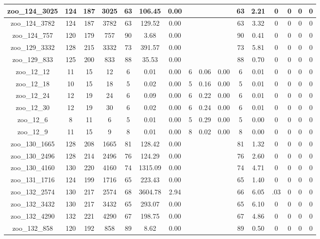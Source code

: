 \begin{landscape}
\begin{longtable}{|c|c|c|c|c|c|c|c|c|c|c|c|c|c|c|c|}
zoo\_124\_3025 & 124 & 187 & 3025 & 63 & 106.45 & 0.00 &  &  &  & 63 & 2.21 & 0 & 0 & 0 & 0 \\ \hline 
zoo\_124\_3782 & 124 & 187 & 3782 & 63 & 129.52 & 0.00 &  &  &  & 63 & 3.32 & 0 & 0 & 0 & 0 \\ \hline 
zoo\_124\_757 & 120 & 179 & 757 & 90 & 3.68 & 0.00 &  &  &  & 90 & 0.41 & 0 & 0 & 0 & 0 \\ \hline 
zoo\_129\_3332 & 128 & 215 & 3332 & 73 & 391.57 & 0.00 &  &  &  & 73 & 5.81 & 0 & 0 & 0 & 0 \\ \hline 
zoo\_129\_833 & 125 & 200 & 833 & 88 & 35.53 & 0.00 &  &  &  & 88 & 0.70 & 0 & 0 & 0 & 0 \\ \hline 
zoo\_12\_12 & 11 & 15 & 12 & 6 & 0.01 & 0.00 & 6 & 0.06 & 0.00 & 6 & 0.01 & 0 & 0 & 0 & 0 \\ \hline 
zoo\_12\_18 & 10 & 15 & 18 & 5 & 0.02 & 0.00 & 5 & 0.16 & 0.00 & 5 & 0.01 & 0 & 0 & 0 & 0 \\ \hline 
zoo\_12\_24 & 12 & 19 & 24 & 6 & 0.09 & 0.00 & 6 & 0.22 & 0.00 & 6 & 0.01 & 0 & 0 & 0 & 0 \\ \hline 
zoo\_12\_30 & 12 & 19 & 30 & 6 & 0.02 & 0.00 & 6 & 0.24 & 0.00 & 6 & 0.01 & 0 & 0 & 0 & 0 \\ \hline 
zoo\_12\_6 & 8 & 11 & 6 & 5 & 0.01 & 0.00 & 5 & 0.29 & 0.00 & 5 & 0.00 & 0 & 0 & 0 & 0 \\ \hline 
zoo\_12\_9 & 11 & 15 & 9 & 8 & 0.01 & 0.00 & 8 & 0.02 & 0.00 & 8 & 0.00 & 0 & 0 & 0 & 0 \\ \hline 
zoo\_130\_1665 & 128 & 208 & 1665 & 81 & 128.42 & 0.00 &  &  &  & 81 & 1.32 & 0 & 0 & 0 & 0 \\ \hline 
zoo\_130\_2496 & 128 & 214 & 2496 & 76 & 124.29 & 0.00 &  &  &  & 76 & 2.60 & 0 & 0 & 0 & 0 \\ \hline 
zoo\_130\_4160 & 130 & 220 & 4160 & 74 & 1315.09 & 0.00 &  &  &  & 74 & 4.71 & 0 & 0 & 0 & 0 \\ \hline 
zoo\_131\_1716 & 124 & 199 & 1716 & 65 & 223.43 & 0.00 &  &  &  & 65 & 1.40 & 0 & 0 & 0 & 0 \\ \hline 
zoo\_132\_2574 & 130 & 217 & 2574 & 68 & 3604.78 & 2.94 &  &  &  & 66 & 6.05 & .03 & 0 & 0 & 0 \\ \hline 
zoo\_132\_3432 & 130 & 217 & 3432 & 65 & 293.07 & 0.00 &  &  &  & 65 & 6.10 & 0 & 0 & 0 & 0 \\ \hline 
zoo\_132\_4290 & 132 & 221 & 4290 & 67 & 198.75 & 0.00 &  &  &  & 67 & 4.86 & 0 & 0 & 0 & 0 \\ \hline 
zoo\_132\_858 & 120 & 192 & 858 & 89 & 8.62 & 0.00 &  &  &  & 89 & 0.50 & 0 & 0 & 0 & 0 \\ \hline 

\end{longtable}
\end{landscape}
